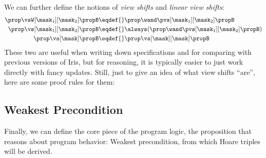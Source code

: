 We can further define the notions of \emph{view shifts} and \emph{linear view shifts}:
\begin{align*}
  \prop \vsW[\mask_1][\mask_2] \propB \eqdef{}& \prop \wand \pvs[\mask_1][\mask_2] \propB \\
  \prop \vs[\mask_1][\mask_2] \propB \eqdef{}& \always(\prop \wand \pvs[\mask_1][\mask_2] \propB) \\
  \prop \vs[\mask] \propB \eqdef{}& \prop \vs[\mask][\mask] \propB
\end{align*}
These two are useful when writing down specifications and for comparing with previous versions of Iris, but for reasoning, it is typically easier to just work directly with fancy updates.
Still, just to give an idea of what view shifts ``are'', here are some proof rules for them:

\subsection{Weakest Precondition}

Finally, we can define the core piece of the program logic, the proposition that reasons about program behavior: Weakest precondition, from which Hoare triples will be derived.

